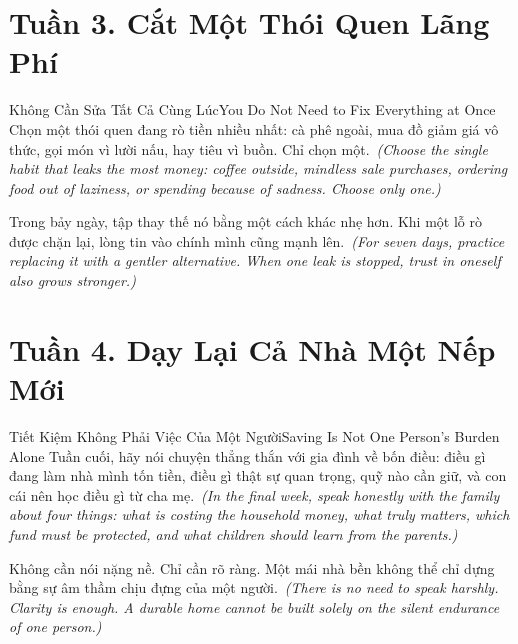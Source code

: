 \section*{Tuần 3. Cắt Một Thói Quen Lãng Phí}
\begin{truyen}{Không Cần Sửa Tất Cả Cùng Lúc}{You Do Not Need to Fix Everything at Once}
Chọn một thói quen đang rò tiền nhiều nhất: cà phê ngoài, mua đồ giảm giá vô thức, gọi món vì lười nấu, hay tiêu vì buồn. Chỉ chọn một.\
\textit{(Choose the single habit that leaks the most money: coffee outside, mindless sale purchases, ordering food out of laziness, or spending because of sadness. Choose only one.)}

Trong bảy ngày, tập thay thế nó bằng một cách khác nhẹ hơn. Khi một lỗ rò được chặn lại, lòng tin vào chính mình cũng mạnh lên.\
\textit{(For seven days, practice replacing it with a gentler alternative. When one leak is stopped, trust in oneself also grows stronger.)}
\end{truyen}

\section*{Tuần 4. Dạy Lại Cả Nhà Một Nếp Mới}
\begin{truyen}{Tiết Kiệm Không Phải Việc Của Một Người}{Saving Is Not One Person’s Burden Alone}
Tuần cuối, hãy nói chuyện thẳng thắn với gia đình về bốn điều: điều gì đang làm nhà mình tốn tiền, điều gì thật sự quan trọng, quỹ nào cần giữ, và con cái nên học điều gì từ cha mẹ.\
\textit{(In the final week, speak honestly with the family about four things: what is costing the household money, what truly matters, which fund must be protected, and what children should learn from the parents.)}

Không cần nói nặng nề. Chỉ cần rõ ràng. Một mái nhà bền không thể chỉ dựng bằng sự âm thầm chịu đựng của một người.\
\textit{(There is no need to speak harshly. Clarity is enough. A durable home cannot be built solely on the silent endurance of one person.)}
\end{truyen}

